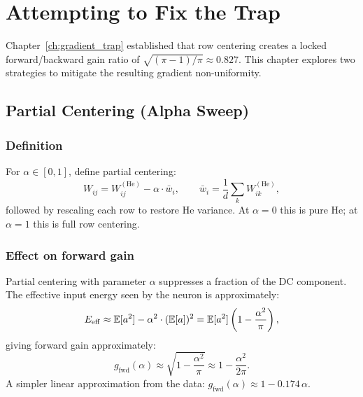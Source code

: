\chapter{Attempting to Fix the Trap}
\label{ch:fixing_trap}

Chapter~\ref{ch:gradient_trap} established that row centering creates a
locked forward/backward gain ratio of $\sqrt{(\pi-1)/\pi} \approx 0.827$.
This chapter explores two strategies to mitigate the resulting gradient
non-uniformity.

\section{Partial Centering (Alpha Sweep)}
\label{sec:alpha_sweep}

\subsection{Definition}

For $\alpha \in [0,1]$, define partial centering:
\begin{equation}\label{eq:partial_centering}
  W_{ij} = W_{ij}^{(\mathrm{He})}
           - \alpha \cdot \bar{w}_i,
  \qquad
  \bar{w}_i = \frac{1}{d}\sum_k W_{ik}^{(\mathrm{He})},
\end{equation}
followed by rescaling each row to restore He variance.
At $\alpha = 0$ this is pure He; at $\alpha = 1$ this is full row
centering.

\subsection{Effect on forward gain}

Partial centering with parameter $\alpha$ suppresses a fraction of the
DC component.  The effective input energy seen by the neuron is
approximately:
\begin{equation}
  E_{\mathrm{eff}} \approx \mathbb{E}[a^2] - \alpha^2 \cdot (\mathbb{E}[a])^2
  = \mathbb{E}[a^2]\left(1 - \frac{\alpha^2}{\pi}\right),
\end{equation}
giving forward gain approximately:
\begin{equation}\label{eq:partial_fwd}
  g_{\mathrm{fwd}}(\alpha) \approx \sqrt{1 - \frac{\alpha^2}{\pi}}
  \approx 1 - \frac{\alpha^2}{2\pi}.
\end{equation}
A simpler linear approximation from the data:
$g_{\mathrm{fwd}}(\alpha) \approx 1 - 0.174\,\alpha$.

